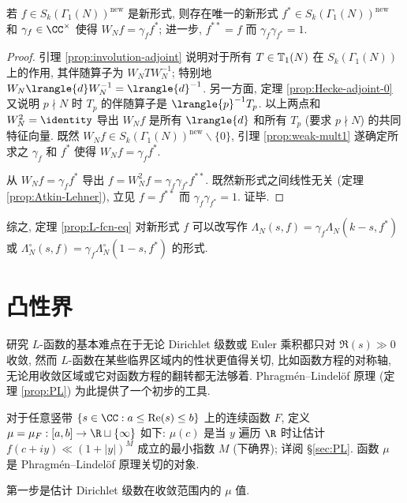 \begin{proposition}
	若 $f \in S_k(\Gamma_1(N))^{\mathrm{new}}$ 是新形式, 则存在唯一的新形式 $f^* \in S_k(\Gamma_1(N))^{\mathrm{new}}$ 和 $\gamma_f \in \CC^\times$ 使得 $W_N f = \gamma_f f^*$; 进一步, $f^{**} = f$ 而 $\gamma_f \gamma_{f^*} = 1$.
\end{proposition}
\begin{proof}
	引理 \ref{prop:involution-adjoint} 说明对于所有 $T \in \mathbb{T}_1(N)$ 在 $S_k(\Gamma_1(N))$ 上的作用, 其伴随算子为 $W_N T W_N^{-1}$; 特别地 $W_N \lrangle{d} W_N^{-1} = \lrangle{d}^{-1}$. 另一方面, 定理 \ref{prop:Hecke-adjoint-0} 又说明 $p \nmid N$ 时 $T_p$ 的伴随算子是 $\lrangle{p}^{-1} T_p$. 以上两点和 $W_N^2 = \identity$ 导出 $W_N f$ 是所有 $\lrangle{d}$ 和所有 $T_p$ (要求 $p \nmid N$) 的共同特征向量. 既然 $W_N f \in S_k(\Gamma_1(N))^{\mathrm{new}} \smallsetminus \{0\}$, 引理 \ref{prop:weak-mult1} 遂确定所求之 $\gamma_f$ 和 $f^*$ 使得 $W_N f = \gamma_f f^*$.
	
	从 $W_N f = \gamma_f f^*$ 导出 $f = W_N^2 f = \gamma_f \gamma_{f^*} f^{**}$. 既然新形式之间线性无关 (定理 \ref{prop:Atkin-Lehner}), 立见 $f = f^{**}$ 而 $\gamma_f \gamma_{f^*} = 1$. 证毕.
\end{proof}

综之, 定理 \ref{prop:L-fcn-eq} 对新形式 $f$ 可以改写作 $\Lambda_N(s, f) = \gamma_f \Lambda_N(k - s, f^*)$ 或 $\Lambda_N^\circ(s, f) = \gamma_f \Lambda_N^\circ(1 - s, f^*)$ 的形式.

\section{凸性界}\label{sec:convexity}
研究 $L$-函数的基本难点在于无论 Dirichlet 级数或 Euler 乘积都只对 $\Re(s) \gg 0$ 收敛, 然而 $L$-函数在某些临界区域内的性状更值得关切, 比如函数方程的对称轴, 无论用收敛区域或它对函数方程的翻转都无法够着. Phragmén--Lindelöf 原理 (定理 \ref{prop:PL}) 为此提供了一个初步的工具.

对于任意竖带 $\{ s \in \CC : a \leq \Re(s) \leq b \}$ 上的连续函数 $F$, 定义 $\mu = \mu_F: [a,b] \to \R \sqcup \{\infty\}$ 如下: $\mu(c)$ 是当 $y$ 遍历 $\R$ 时让估计 $f(c+iy) \ll (1+|y|)^M$ 成立的最小指数 $M$ (下确界); 详阅 \S\ref{sec:PL}. 函数 $\mu$ 是 Phragmén--Lindelöf 原理关切的对象.
 

第一步是估计 Dirichlet 级数在收敛范围内的 $\mu$ 值.

